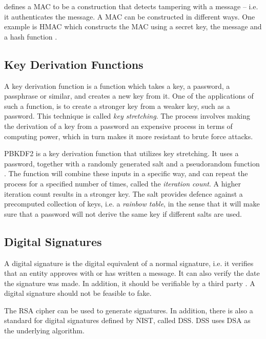 \documentclass[pdftex,english,10pt,b5paper,twoside]{book}
\begin{document}
\citet{schneier} defines a \ac{MAC} to be a construction that detects tampering
with a message -- i.e. it authenticates the message. A \ac{MAC} can be
constructed in different ways. One example is H\ac{MAC} which constructs the
\ac{MAC} using a secret key, the message and a hash function \cite{rfc2104}.

\subsection{Key Derivation Functions}
\label{sec:PBKDF2}

A key derivation function is a function which takes a key, a password, a
passphrase or similar, and creates a new key from it. One of the applications
of such a function, is to create a stronger key from a weaker key, such as a
password. This technique is called \emph{key stretching}. The process involves
making the derivation of a key from a password an expensive process in terms of
computing power, which in turn makes it more resistant to brute force attacks.

\ac{PBKDF2} is a key derivation function that utilizes key stretching. It uses
a password, together with a randomly generated salt and a pseudorandom function
\cite{rfc2898}. The function will combine these inputs in a specific way, and
can repeat the process for a specified number of times, called the
\emph{iteration count}. A higher iteration count results in a stronger key. The
salt provides defence against a precomputed collection of keys, i.e. a
\emph{rainbow table}, in the sense that it will make sure that a password will
not derive the same key if different salts are used.

\subsection{Digital Signatures}

A digital signature is the digital equivalent of a normal signature, i.e. it
verifies that an entity approves with or has written a message. It can also
verify the date the signature was made. In addition, it should be verifiable by
a third party \cite[p.  379]{stallings}. A digital signature should not be
feasible to fake.

The \ac{RSA} cipher can be used to generate signatures. In addition, there is
also a standard for digital signatures defined by \ac{NIST}, called
\ac{DSS}\cite{DSS-FIPS}.  \ac{DSS} uses \ac{DSA} as the underlying algorithm.
\end{document}
